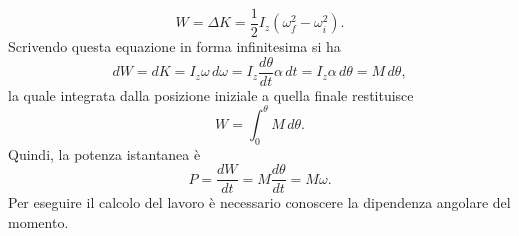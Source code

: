 \begin{equation}
\label{eq: lavoro rotazione corpo rigido}
    W=\Delta K=\frac{1}{2}I_z(\omega^2_f-\omega^2_i).
\end{equation}
Scrivendo questa equazione in forma infinitesima si ha
\begin{equation}
    dW=dK=I_z\omega\,d\omega=I_z\frac{d\theta}{dt}\alpha\,dt=I_z\alpha\,d\theta=M\,d\theta,
\end{equation}
la quale integrata dalla posizione iniziale a quella finale restituisce 
\begin{equation}
    W=\int_0^\theta M\,d\theta.
\end{equation}
Quindi, la potenza istantanea è
\begin{equation}
    P=\frac{dW}{dt}=M\frac{d\theta}{dt}=M\omega.
\end{equation}
Per eseguire il calcolo del lavoro è necessario conoscere la dipendenza angolare del momento.

